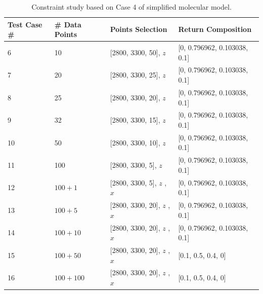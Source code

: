 \begin{table} \small
\begin{center}
{\def\arraystretch{1.5}
\begin{tabular}{| p{1cm} | p{3cm} | p{5cm} | l |} \hline
	Test Case \# & \# Data Points & Points Selection & Return Composition \\ \hline
	6 & 10 & [2800, 3300, 50], $z$ & [0, 0.796962, 0.103038, 0.1] \\ \hline
	7 & 20 & [2800, 3300, 25], $z$ & [0, 0.796962, 0.103038, 0.1] \\ \hline
	8 & 25 & [2800, 3300, 20], $z$ & [0, 0.796962, 0.103038, 0.1] \\ \hline
	9 & 32 & [2800, 3300, 15], $z$ & [0, 0.796962, 0.103038, 0.1] \\ \hline
	10 & 50 & [2800, 3300, 10], $z$ & [0, 0.796962, 0.103038, 0.1] \\ \hline
	11 & 100 & [2800, 3300, 5], $z$ & [0, 0.796962, 0.103038, 0.1] \\ \hline
	12 & $100 + 1$ & [2800, 3300, 5], $z$ \newline [2800, 3300, 500], $x$ & [0, 0.796962, 0.103038, 0.1] \\ \hline
	13 & $100 + 5$ & [2800, 3300, 20], $z$ \newline [2800, 3300, 100], $x$ & [0, 0.796962, 0.103038, 0.1] \\ \hline
	14 & $100 + 10$ & [2800, 3300, 20], $z$ \newline  [2800, 3300, 50], $x$ & [0, 0.796962, 0.103038, 0.1] \\ \hline
	15 & $100 + 50$ & [2800, 3300, 20], $z$ \newline  [2800, 3300, 10], $x$ & [0.1, 0.5, 0.4, 0] \\ \hline
	16 & $100 + 100$ & [2800, 3300, 20], $z$ \newline  [2800, 3300, 5], $x$ & [0.1, 0.5, 0.4, 0] \\ 
	\hline
\end{tabular} 
}
\end{center}
\caption{Constraint study based on Case 4 of simplified molecular model.} \label{tab:7.3}
\end{table}

